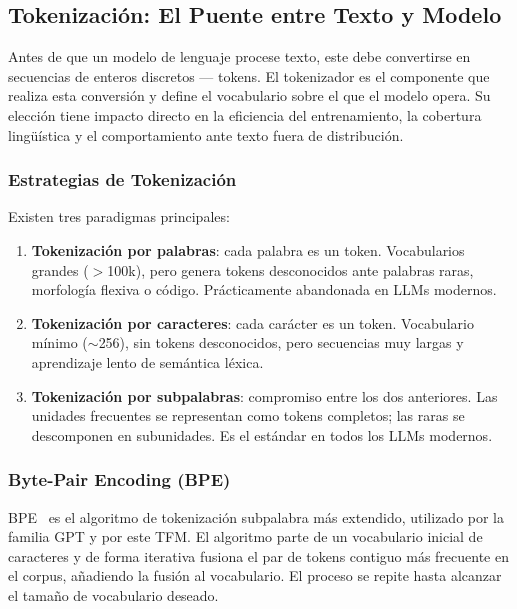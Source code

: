 \subsection{Tokenización: El Puente entre Texto y Modelo}

Antes de que un modelo de lenguaje procese texto, este debe convertirse en secuencias de enteros discretos --- tokens. El tokenizador es el componente que realiza esta conversión y define el vocabulario sobre el que el modelo opera. Su elección tiene impacto directo en la eficiencia del entrenamiento, la cobertura lingüística y el comportamiento ante texto fuera de distribución.

\subsubsection{Estrategias de Tokenización}

Existen tres paradigmas principales:

\begin{enumerate}
    \item \textbf{Tokenización por palabras}: cada palabra es un token. Vocabularios grandes ($>$100k), pero genera tokens desconocidos ante palabras raras, morfología flexiva o código. Prácticamente abandonada en LLMs modernos.

    \item \textbf{Tokenización por caracteres}: cada carácter es un token. Vocabulario mínimo ($\sim$256), sin tokens desconocidos, pero secuencias muy largas y aprendizaje lento de semántica léxica.

    \item \textbf{Tokenización por subpalabras}: compromiso entre los dos anteriores. Las unidades frecuentes se representan como tokens completos; las raras se descomponen en subunidades. Es el estándar en todos los LLMs modernos.
\end{enumerate}

\subsubsection{Byte-Pair Encoding (BPE)}

BPE~\cite{sennrich2016bpe} es el algoritmo de tokenización subpalabra más extendido, utilizado por la familia GPT y por este TFM. El algoritmo parte de un vocabulario inicial de caracteres y de forma iterativa fusiona el par de tokens contiguo más frecuente en el corpus, añadiendo la fusión al vocabulario. El proceso se repite hasta alcanzar el tamaño de vocabulario deseado.

